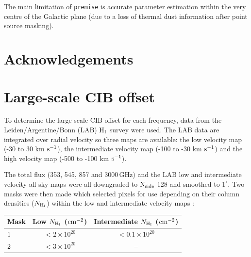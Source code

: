 \documentclass[a4paper,fleqn,usenatbib]{mnras}
\begin{document}
{The main limitation of {\texttt{premise}} is accurate parameter estimation within the very centre of the Galactic plane (due to a loss of thermal dust information after point source masking).  

\section*{Acknowledgements}








\newpage

\appendix

\section{Large-scale CIB offset}\label{sec:apA}

To determine the large-scale CIB offset for each frequency, data from the Leiden/Argentine/Bonn (LAB) $\rm{H_{I}}$ survey \citep{lab} were used. The LAB data are integrated over radial velocity so three maps are available: the low velocity map (-30 to 30 km $\rm{s}^{-1}$), the intermediate velocity map (-100 to -30 km $\rm{s}^{-1}$) and the high velocity map (-500 to -100 km $\rm{s}^{-1}$). 

The total flux (353, 545, 857 and 3000\,GHz) and the LAB low and intermediate velocity all-sky maps were all downgraded to $\rm{N_{side}}$ 128 and smoothed to $1^{\circ}$. Two masks were then made which selected pixels for use depending on their column densities ($N_{\rm{H_{I}}}$) within the low and intermediate velocity maps :

\begin{tabular}{ l | c | c  }
\hline
  Mask & Low $N_{\rm{H_{I}}}$ ($\rm{cm}^{-2}$) & Intermediate $N_{\rm{H_{I}}}$ ($\rm{cm}^{-2}$)  \\
  \hline
  1 &  $< 2 \times 10^{20}$  & $ < 0.1 \times 10^{20}$ \\
  2 &  $ < 3 \times 10^{20}$  & -- \\
  \hline
\end{tabular}

}
\end{document}
